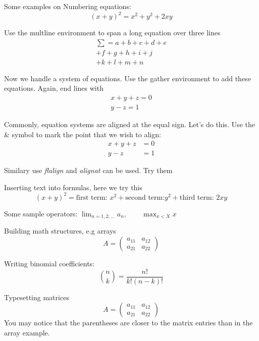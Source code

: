 Some examples on Numbering equations:
\begin{equation} \label{key}
 (x+y)^2 = x^2 + y^2 + 2xy
\end{equation}

Use the multline environment to span a long equation over three lines
\begin{multline}
\sum = a + b + c + d + e \\
        + f + g + h + i + j \\
        + k + l + m + n
\end{multline}


Now we handle a system of equations. Use the gather environment to add these equations. Again, end lines with
\begin{gather}
 x + y + z = 0 \\
 y - z = 1
\end{gather}


Commonly, equation systems are aligned at the equal sign. Let's do this. Use the $\&$ symbol to mark the point that we wish to align:
\begin{align}
 x + y + z &= 0 \\
 y - z &= 1
\end{align}

Similary use \emph{flalign} and \emph{alignat} can be used. Try them

Inserting text into formulas, here we try this
\begin{equation} \label{key2}
 (x+y)^2 = \text{first term: } x^2 + \text{second term:} y^2 +  \text{third term: } 2xy
\end{equation}

Some sample operators:
\(
  \lim_{n=1, 2, \ldots} a_n, \qquad \max_{x<X} x
\)

Building math structures, e.g arrays
\[
 A = \left(
 \begin{array}{cc}
 a_{11} & a_{12} \\
 a_{21} & a_{22}
 \end{array}
 \right)
\]

Writing binomial coefficients:
\[
  \binom{n}{k} = \frac{n!}{k!(n-k)!}
\]

Typesetting matrices
\[
A = \begin{pmatrix}
      a_{11} & a_{12} \\
      a_{21} & a_{22}
    \end{pmatrix}
\]
You may notice that the parentheses are closer to the matrix entries than in the array example.

